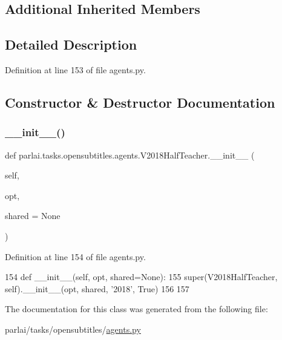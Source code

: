 \subsection*{Additional Inherited Members}


\subsection{Detailed Description}


Definition at line 153 of file agents.\+py.



\subsection{Constructor \& Destructor Documentation}
\mbox{\label{classparlai_1_1tasks_1_1opensubtitles_1_1agents_1_1V2018HalfTeacher_ac42e92db06e46aa2a9fef8883bb17117}} 
\subsubsection{\texorpdfstring{\+\_\+\+\_\+init\+\_\+\+\_\+()}{\_\_init\_\_()}}
{\footnotesize\ttfamily def parlai.\+tasks.\+opensubtitles.\+agents.\+V2018\+Half\+Teacher.\+\_\+\+\_\+init\+\_\+\+\_\+ (\begin{DoxyParamCaption}\item[{}]{self,  }\item[{}]{opt,  }\item[{}]{shared = {\ttfamily None} }\end{DoxyParamCaption})}



Definition at line 154 of file agents.\+py.


\begin{DoxyCode}
154     \textcolor{keyword}{def }\_\_init\_\_(self, opt, shared=None):
155         super(V2018HalfTeacher, self).\_\_init\_\_(opt, shared, \textcolor{stringliteral}{'2018'}, \textcolor{keyword}{True})
156 
157 
\end{DoxyCode}


The documentation for this class was generated from the following file\+:\begin{DoxyCompactItemize}
\item 
parlai/tasks/opensubtitles/\hyperlink{parlai_2tasks_2opensubtitles_2agents_8py}{agents.\+py}\end{DoxyCompactItemize}
